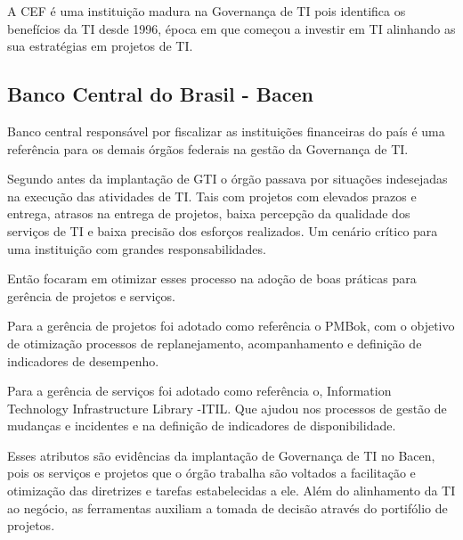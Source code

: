 A CEF é uma instituição madura na Governança de TI pois identifica os benefícios da TI desde 1996, época em que começou a investir em TI alinhando as sua estratégias em projetos de TI.  
 
 \subsection{Banco Central do Brasil - Bacen}
 
 Banco central responsável por fiscalizar as instituições financeiras do país é uma referência para os demais órgãos federais na gestão da Governança de TI. 
 
 Segundo \cite{Bacen} antes da implantação de GTI o órgão passava por situações indesejadas na execução das atividades de TI. Tais com projetos com elevados prazos e entrega, atrasos na entrega de projetos, baixa percepção da qualidade dos serviços de TI e baixa precisão dos esforços realizados. Um cenário crítico para uma instituição com grandes responsabilidades. 
 
 Então focaram em otimizar esses processo na adoção de boas práticas para gerência de projetos e serviços. 
 
 Para a gerência de projetos foi adotado como referência o PMBok, com o objetivo de otimização processos de replanejamento, acompanhamento e definição de indicadores de desempenho.
 
 Para a gerência de serviços foi adotado como referência o, Information Technology Infrastructure Library -ITIL. Que ajudou nos processos de gestão de mudanças e incidentes e na definição de indicadores de disponibilidade.
 
 Esses atributos são evidências da implantação de Governança de TI no Bacen, pois os serviços e projetos que o órgão trabalha são voltados a facilitação e otimização das diretrizes e tarefas estabelecidas a ele. Além do alinhamento da TI ao negócio, as ferramentas auxiliam a tomada de decisão através do portifólio de projetos.
 
 